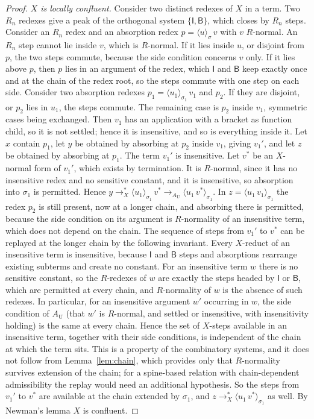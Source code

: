 \documentclass[11pt]{article}
\theoremstyle{definition}
\theoremstyle{remark}
\newcommand{\cI}{\mathsf{I}}
\newcommand{\cB}{\mathsf{B}}
\newcommand{\br}[2]{\langle #1\rangle_{#2}}
\begin{document}
\begin{proof}
\emph{$X$ is locally confluent.} Consider two distinct redexes of $X$ in a term. Two $R_n$ redexes give a peak of the orthogonal system $\{\cI,\cB\}$, which closes by $R_n$ steps. Consider an $R_n$ redex and an absorption redex $p=\br u\sigma\,v$ with $v$ $R$-normal. An $R_n$ step cannot lie inside $v$, which is $R$-normal. If it lies inside $u$, or disjoint from $p$, the two steps commute, because the side condition concerns $v$ only. If it lies above $p$, then $p$ lies in an argument of the redex, which $\cI$ and $\cB$ keep exactly once and at the chain of the redex root, so the steps commute with one step on each side. Consider two absorption redexes $p_1=\br{u_1}{\sigma_1}\,v_1$ and $p_2$. If they are disjoint, or $p_2$ lies in $u_1$, the steps commute. The remaining case is $p_2$ inside $v_1$, symmetric cases being exchanged. Then $v_1$ has an application with a bracket as function child, so it is not settled; hence it is insensitive, and so is everything inside it. Let $x$ contain $p_1$, let $y$ be obtained by absorbing at $p_2$ inside $v_1$, giving $v_1'$, and let $z$ be obtained by absorbing at $p_1$. The term $v_1'$ is insensitive. Let $v^{\ast}$ be an $X$-normal form of $v_1'$, which exists by termination. It is $R$-normal, since it has no insensitive redex and no sensitive constant, and it is insensitive, so absorption into $\sigma_1$ is permitted. Hence $y\to_X^{*}\br{u_1}{\sigma_1}\,v^{\ast}\to_{A_{\mathrm U}}\br{u_1\,v^{\ast}}{\sigma_1}$. In $z=\br{u_1\,v_1}{\sigma_1}$ the redex $p_2$ is still present, now at a longer chain, and absorbing there is permitted, because the side condition on its argument is $R$-normality of an insensitive term, which does not depend on the chain. The sequence of steps from $v_1'$ to $v^{\ast}$ can be replayed at the longer chain by the following invariant. Every $X$-reduct of an insensitive term is insensitive, because $\cI$ and $\cB$ steps and absorptions rearrange existing subterms and create no constant. For an insensitive term $w$ there is no sensitive constant, so the $R$-redexes of $w$ are exactly the steps headed by $\cI$ or $\cB$, which are permitted at every chain, and $R$-normality of $w$ is the absence of such redexes. In particular, for an insensitive argument $w'$ occurring in $w$, the side condition of $A_{\mathrm U}$ (that $w'$ is $R$-normal, and settled or insensitive, with insensitivity holding) is the same at every chain. Hence the set of $X$-steps available in an insensitive term, together with their side conditions, is independent of the chain at which the term sits. This is a property of the combinatory systems, and it does not follow from Lemma~\ref{lem:chain}, which provides only that $R$-normality survives extension of the chain; for a spine-based relation with chain-dependent admissibility the replay would need an additional hypothesis. So the steps from $v_1'$ to $v^{\ast}$ are available at the chain extended by $\sigma_1$, and $z\to_X^{*}\br{u_1\,v^{\ast}}{\sigma_1}$ as well. By Newman's lemma $X$ is confluent.


\end{proof}
\end{document}
